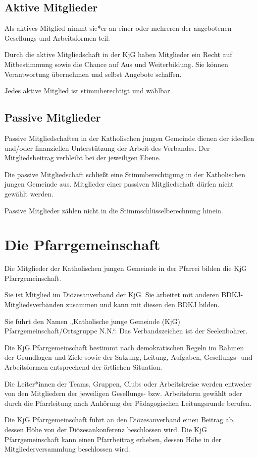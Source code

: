 \documentclass[12pt]{report}
\begin{document}
\begin{flushleft}
\subsection{Aktive Mitglieder}
Als aktives Mitglied nimmt sie*er an einer oder mehreren der angebotenen Gesellungs­ und Arbeitsformen teil.

Durch die aktive Mitgliedschaft in der KjG haben Mitglieder ein Recht auf Mitbestimmung
sowie die Chance auf Aus­ und Weiterbildung. Sie können Verantwortung übernehmen und selbst
Angebote schaffen.

Jedes aktive Mitglied ist stimmberechtigt und wählbar.
\subsection{Passive Mitglieder}
Passive Mitgliedschaften in der Katholischen jungen Gemeinde dienen der ideellen und/oder finanziellen Unterstützung der Arbeit des Verbandes.
Der Mitgliedsbeitrag verbleibt bei der jeweiligen Ebene.

Die passive Mitgliedschaft schließt eine Stimmberechtigung in der Katholischen jungen
Gemeinde aus. Mitglieder einer passiven Mitgliedschaft dürfen nicht gewählt werden.

Passive Mitglieder zählen nicht in die Stimmschlüsselberechnung hinein.
\section{Die Pfarrgemeinschaft}
Die Mitglieder der Katholischen jungen Gemeinde in der Pfarrei bilden die KjG Pfarrgemeinschaft.

Sie ist Mitglied im Diözesanverband der KjG. Sie arbeitet mit anderen BDKJ-Mitgliedsverbänden
zusammen und kann mit diesen den BDKJ bilden.

Sie führt den Namen „Katholische junge Gemeinde (KjG) Pfarrgemeinschaft/Ortsgruppe N.N.“.
Das Verbandszeichen ist der Seelenbohrer.

Die KjG Pfarrgemeinschaft bestimmt nach demokratischen Regeln im Rahmen der Grundlagen
und Ziele sowie der Satzung, Leitung, Aufgaben, Gesellungs- und Arbeitsformen entsprechend
der örtlichen Situation.

Die Leiter*innen der Teams, Gruppen, Clubs oder Arbeitskreise werden entweder von den Mitgliedern
der jeweiligen Gesellungs- bzw. Arbeitsform gewählt oder durch die Pfarrleitung nach
Anhörung der Pädagogischen Leitungsrunde berufen.

Die KjG Pfarrgemeinschaft führt an den Diözesanverband einen Beitrag ab, dessen Höhe von der
Diözesankonferenz beschlossen wird. Die KjG Pfarrgemeinschaft kann einen Pfarrbeitrag erheben,
dessen Höhe in der Mitgliederversammlung beschlossen wird.


\end{flushleft}
\end{document}

